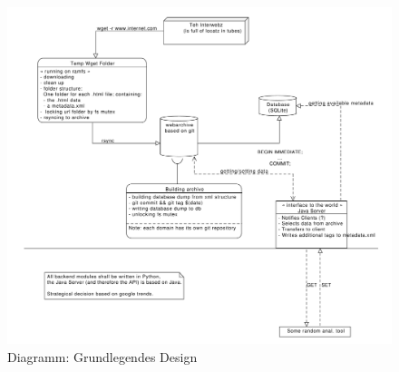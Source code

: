 \newpage 

\begin{figure}
	\centering
	\label{spec:dia:moduls}
	\includegraphics[width=\textwidth]{spezi/webarchiv_design.pdf}
	\caption{Diagramm: Grundlegendes Design}
\end{figure}
 
